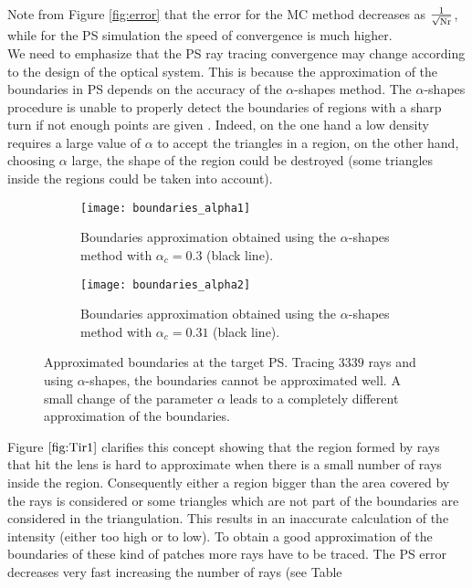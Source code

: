 Note from Figure \ref{fig:error} that the error for the MC method decreases as $\frac{1}{\sqrt{\textrm{Nr}}}$, while for the PS simulation the speed of convergence is much higher.\\ \indent
We need to emphasize that the PS ray tracing convergence may change according to the design of the optical system.
This is because the approximation of the boundaries in PS depends on the accuracy of the $\alpha$-shapes method.
The $\alpha$-shapes procedure is unable to properly detect the boundaries of regions with a sharp turn if not enough points are given
\cite{teichmann1998surface}. Indeed, on the one hand a low density requires a large value of $\alpha$ to accept the triangles in a region, on the other hand,
 choosing $\alpha$ large, the shape of the region could be destroyed (some triangles inside the regions could be taken into account).
\begin{figure}[h]
\centering
\begin{subfigure}{.48\textwidth}
  \centering
  \texttt{[image: boundaries\_alpha1]}
  \caption{Boundaries approximation obtained using the $\alpha$-shapes method with $\alpha_c = 0.3$ (black line).}
\end{subfigure}
\begin{subfigure}{.48\textwidth}
  \centering
  \texttt{[image: boundaries\_alpha2]}
  \caption{Boundaries approximation obtained using the $\alpha$-shapes method with $\alpha_c = 0.31$ (black line).}
\end{subfigure}
\caption{Approximated boundaries at the target PS. Tracing $3339$ rays and using $\alpha$-shapes, the boundaries cannot be approximated well. 
A small change of the parameter $\alpha$ leads to a completely different approximation of the boundaries.}
\label{fig:Tir1}
\end{figure}
Figure $\ref{fig:Tir1}$ clarifies this concept showing that the region formed by rays that hit the lens is hard to approximate when there is a small number of rays inside the region. Consequently either a region bigger than the area covered by the rays is considered or some triangles which are not part of the boundaries are considered in the triangulation. This results in an inaccurate calculation of the intensity (either too high or to low). To obtain a good approximation of the boundaries of these kind of patches more rays have to be traced. The PS error decreases very fast increasing the number of rays (see Table

